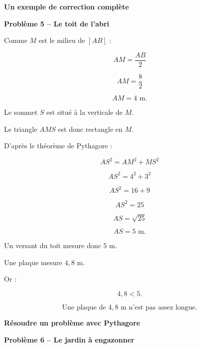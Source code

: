 \documentclass[11pt,a4paper]{article}
\newcommand{\titreprobleme}[2]{%
\noindent
\begin{minipage}{\linewidth}
\centering
{\sffamily\LARGE\bfseries\color{TitreC}
Résoudre un problème avec Pythagore}

\vspace{0.5mm}

{\sffamily\large\bfseries\color{SavoirC}
Problème #1 -- #2}
\end{minipage}

\vspace{1mm}
}
\newcommand{\titrecorrection}[1]{%
\noindent
\begin{minipage}{\linewidth}
\centering
{\sffamily\LARGE\bfseries\color{TitreC}
Un exemple de correction complète}

\vspace{0.5mm}

{\sffamily\large\bfseries\color{SavoirC}
#1}
\end{minipage}

\vspace{2mm}
}
\newcommand{\pagecorrection}[2]{%

\titrecorrection{#1}

\begin{correctionbox}

#2

\end{correctionbox}
}
\begin{document}
\pagecorrection{Problème 5 -- Le toit de l'abri}{

Comme \(M\) est le milieu de \([AB]\) :

\[
AM=\frac{AB}{2}
\]

\[
AM=\frac{8}{2}
\]

\[
AM=4\text{ m}.
\]

Le sommet \(S\) est situé à la verticale de \(M\).

Le triangle \(AMS\) est donc rectangle en \(M\).

D'après le théorème de Pythagore :

\[
AS^2=AM^2+MS^2
\]

\[
AS^2=4^2+3^2
\]

\[
AS^2=16+9
\]

\[
AS^2=25
\]

\[
AS=\sqrt{25}
\]

\[
AS=5\text{ m}.
\]

Un versant du toit mesure donc \(5\) m.

Une plaque mesure \(4{,}8\) m.

Or :

\[
4{,}8<5.
\]

\[
\boxed{\text{Une plaque de }4{,}8\text{ m n'est pas assez longue}.}
\]
}

\newpage


\titreprobleme{6}{Le jardin à engazonner}
\end{document}
